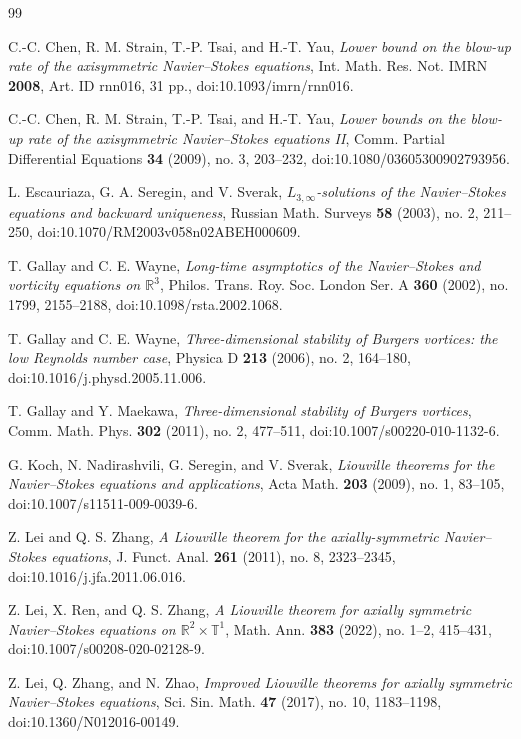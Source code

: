 \documentclass[11pt]{amsart}
\theoremstyle{plain}
\theoremstyle{definition}
\theoremstyle{remark}
\numberwithin{equation}{section}
\begin{document}
\begin{thebibliography}{99}

C.-C. Chen, R. M. Strain, T.-P. Tsai, and H.-T. Yau,
\emph{Lower bound on the blow-up rate of the axisymmetric Navier--Stokes
equations},
Int. Math. Res. Not. IMRN \textbf{2008}, Art. ID rnn016, 31 pp.,
doi:10.1093/imrn/rnn016.

C.-C. Chen, R. M. Strain, T.-P. Tsai, and H.-T. Yau,
\emph{Lower bounds on the blow-up rate of the axisymmetric Navier--Stokes
equations II},
Comm. Partial Differential Equations \textbf{34} (2009), no. 3, 203--232,
doi:10.1080/03605300902793956.

L. Escauriaza, G. A. Seregin, and V. Sverak,
\emph{\(L_{3,\infty}\)-solutions of the Navier--Stokes equations and backward
uniqueness},
Russian Math. Surveys \textbf{58} (2003), no. 2, 211--250,
doi:10.1070/RM2003v058n02ABEH000609.

T. Gallay and C. E. Wayne,
\emph{Long-time asymptotics of the Navier--Stokes and vorticity equations on
\(\mathbb R^3\)},
Philos. Trans. Roy. Soc. London Ser. A \textbf{360} (2002), no. 1799,
2155--2188, doi:10.1098/rsta.2002.1068.

T. Gallay and C. E. Wayne,
\emph{Three-dimensional stability of Burgers vortices: the low Reynolds number
case},
Physica D \textbf{213} (2006), no. 2, 164--180,
doi:10.1016/j.physd.2005.11.006.

T. Gallay and Y. Maekawa,
\emph{Three-dimensional stability of Burgers vortices},
Comm. Math. Phys. \textbf{302} (2011), no. 2, 477--511,
doi:10.1007/s00220-010-1132-6.

G. Koch, N. Nadirashvili, G. Seregin, and V. Sverak,
\emph{Liouville theorems for the Navier--Stokes equations and applications},
Acta Math. \textbf{203} (2009), no. 1, 83--105,
doi:10.1007/s11511-009-0039-6.

Z. Lei and Q. S. Zhang,
\emph{A Liouville theorem for the axially-symmetric Navier--Stokes equations},
J. Funct. Anal. \textbf{261} (2011), no. 8, 2323--2345,
doi:10.1016/j.jfa.2011.06.016.

Z. Lei, X. Ren, and Q. S. Zhang,
\emph{A Liouville theorem for axially symmetric Navier--Stokes equations on
\(\mathbb R^2\times\mathbb T^1\)},
Math. Ann. \textbf{383} (2022), no. 1--2, 415--431,
doi:10.1007/s00208-020-02128-9.

Z. Lei, Q. Zhang, and N. Zhao,
\emph{Improved Liouville theorems for axially symmetric Navier--Stokes
equations},
Sci. Sin. Math. \textbf{47} (2017), no. 10, 1183--1198,
doi:10.1360/N012016-00149.


\end{thebibliography}
\end{document}
